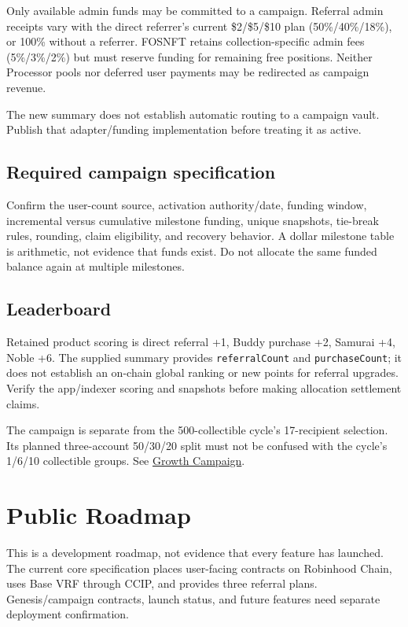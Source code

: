 \documentclass[
  10pt,
  letterpaper,
]{article}
\begin{document}
Only available admin funds may be committed to a campaign. Referral
admin receipts vary with the direct referrer's current \$2/\$5/\$10 plan
(50\%/40\%/18\%), or 100\% without a referrer. FOSNFT retains
collection-specific admin fees (5\%/3\%/2\%) but must reserve funding
for remaining free positions. Neither Processor pools nor deferred user
payments may be redirected as campaign revenue.

The new summary does not establish automatic routing to a campaign
vault. Publish that adapter/funding implementation before treating it as
active.

\subsection{Required campaign
specification}\label{required-campaign-specification}

Confirm the user-count source, activation authority/date, funding
window, incremental versus cumulative milestone funding, unique
snapshots, tie-break rules, rounding, claim eligibility, and recovery
behavior. A dollar milestone table is arithmetic, not evidence that
funds exist. Do not allocate the same funded balance again at multiple
milestones.

\subsection{Leaderboard}\label{leaderboard}

Retained product scoring is direct referral +1, Buddy purchase +2,
Samurai +4, Noble +6. The supplied summary provides
\texttt{referralCount} and \texttt{purchaseCount}; it does not establish
an on-chain global ranking or new points for referral upgrades. Verify
the app/indexer scoring and snapshots before making allocation
settlement claims.

The campaign is separate from the 500-collectible cycle's 17-recipient
selection. Its planned three-account 50/30/20 split must not be confused
with the cycle's 1/6/10 collectible groups. See
\href{https://fos.ooo/document/docs/campaigns/growth}{Growth Campaign}.

\section{Public Roadmap}\label{public-roadmap}

This is a development roadmap, not evidence that every feature has
launched. The current core specification places user-facing contracts on
Robinhood Chain, uses Base VRF through CCIP, and provides three referral
plans. Genesis/campaign contracts, launch status, and future features
need separate deployment confirmation.
\end{document}
